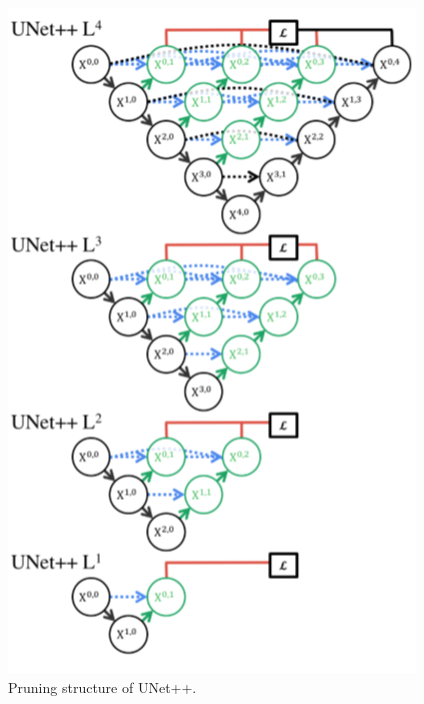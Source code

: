 \begin{figure}[!htpb]
\centering
\includegraphics[scale=0.5]{figuras/unetppPrune.png}
\caption{Pruning structure of UNet++. }
\label{fig:unetppPrune}
\end{figure}
